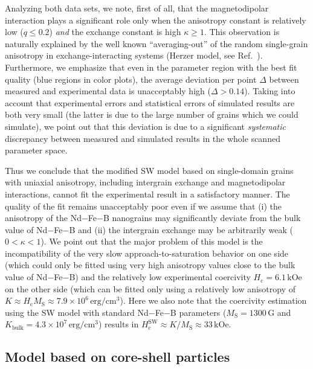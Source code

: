 \documentclass[prm,twocolumn,showkeys,preprintnumbers,amsmath,amssymb,superscriptaddress,aps,10pt]{revtex4-1}
\begin{document}
Analyzing both data sets, we note, first of all, that the magnetodipolar interaction plays a significant role only when the anisotropy constant is relatively low ($q \leq 0.2$) \textit{and} the exchange constant is high $\kappa \geq 1$. This observation is naturally explained by the well known ``averaging-out'' of the random single-grain anisotropy in exchange-interacting systems (Herzer model, see Ref.~).  Furthermore, we emphasize that even in the parameter region with the best fit quality (blue regions in color plots), the average deviation per point $\Delta$ between measured and experimental data is unacceptably high ($\Delta > 0.14$). Taking into account that experimental errors and statistical errors of simulated results are both very small (the latter is due to the large number of grains which we could simulate), we point out that this deviation is due to a significant {\it systematic} discrepancy between measured and simulated results in the whole scanned parameter space.

Thus we conclude that the modified SW model based on single-domain grains with uniaxial anisotropy, including intergrain exchange and magnetodipolar interactions, cannot fit the experimental result in a satisfactory manner. The quality of the fit remains unacceptably poor even if we assume that (i) the anisotropy of the Nd$-$Fe$-$B nanograins may significantly deviate from the bulk value of Nd$-$Fe$-$B and (ii) the intergrain exchange may be arbitrarily weak ($0 < \kappa < 1$). We point out that the major problem of this model is the incompatibility of the very slow approach-to-saturation behavior on one side (which could only be fitted using very high anisotropy values close to the bulk value of Nd$-$Fe$-$B) and the relatively low experimental coercivity $H_{\mathrm{c}} = 6.1 \, \mathrm{kOe}$ on the other side (which can be fitted only using a relatively low anisotropy of $K \approx H_{\mathrm{c}} M_{\mathrm{S}} \approx 7.9 \times 10^6 \, \mathrm{erg/cm^3}$). Here we also note that the coercivity estimation using the SW model with standard Nd$-$Fe$-$B parameters ($M_{\mathrm{S}} = 1300 \, \mathrm{G}$ and $K_{\mathrm{bulk}} = 4.3 \times 10^7 \, \mathrm{erg/cm^3}$) results in $H_{\mathrm{c}}^{\mathrm{SW}} \approx K/M_{\mathrm{S}} \approx 33 \, \mathrm{kOe}$.

\subsection{Model based on core-shell particles}
\end{document}
